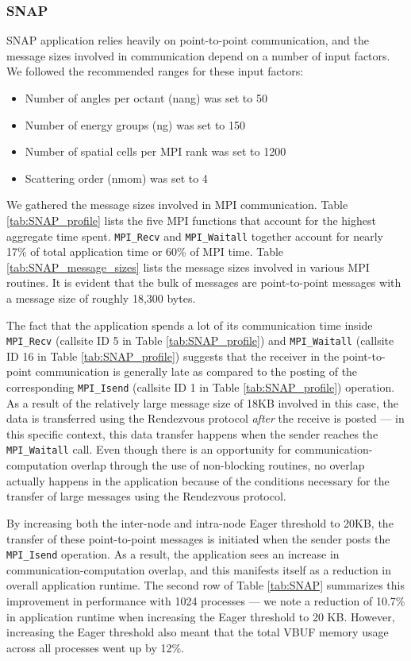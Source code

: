 \subsubsection{SNAP}
SNAP application relies heavily on point-to-point communication, and the message sizes involved in communication depend on a number of input factors. We followed the recommended ranges for these input factors:
\begin{itemize}
\item Number of angles per octant (nang) was set to 50
\item Number of energy groups (ng) was set to 150
\item Number of spatial cells per MPI rank was set to 1200
\item Scattering order (nmom) was set to 4
\end{itemize}
We gathered the message sizes involved in MPI communication. Table \ref{tab:SNAP_profile} lists the five MPI functions that account for the highest aggregate time spent. \verb+MPI_Recv+ and \verb+MPI_Waitall+ together account for nearly 17\% of total application time or 60\% of MPI time. Table \ref{tab:SNAP_message_sizes} lists the message sizes involved in various MPI routines. It is evident that the bulk of messages are point-to-point messages with a message size of roughly 18,300 bytes. \par
The fact that the application spends a lot of its communication time inside \verb+MPI_Recv+ (callsite ID 5 in Table \ref{tab:SNAP_profile}) and \verb+MPI_Waitall+ (callsite ID 16 in Table \ref{tab:SNAP_profile}) suggests that the receiver in the point-to-point communication is generally late as compared to the posting of the corresponding \verb+MPI_Isend+ (callsite ID 1 in Table \ref{tab:SNAP_profile}) operation. As a result of the relatively large message size of 18KB involved in this case, the data is transferred using the Rendezvous protocol \textit{after} the receive is posted --- in this specific context, this data transfer happens when the sender reaches the \verb+MPI_Waitall+ call. Even though there is an opportunity for communication-computation overlap through the use of non-blocking routines, no overlap actually happens in the application because of the conditions necessary for the transfer of large messages using the Rendezvous protocol. \par
By increasing both the inter-node and intra-node Eager threshold to 20KB, the transfer of these point-to-point messages is initiated when the sender posts the \verb+MPI_Isend+ operation. As a result, the application sees an increase in communication-computation overlap, and this manifests itself as a reduction in overall application runtime. The second row of Table \ref{tab:SNAP} summarizes this improvement in performance with 1024 processes --- we note a reduction of 10.7\% in application runtime when increasing the Eager threshold to 20 KB. However, increasing the Eager threshold also meant that the total VBUF memory usage across all processes went up by 12\%. \par
